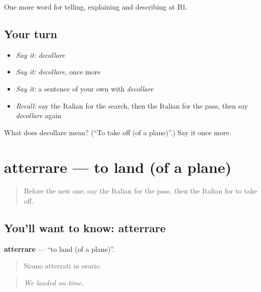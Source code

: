 \begin{grammarlens}[title={What you've built}]
One more word for telling, explaining and describing at B1.
\end{grammarlens}

\subsection*{Your turn}
\begin{itemize}
\raggedright
  \item \emph{Say it:} \emph{decollare}
  \item \emph{Say it:} \emph{decollare}, once more
  \item \emph{Say it:} a sentence of your own with \emph{decollare}
  \item \emph{Recall:} say the Italian for the search, then the Italian for the pass, then say \emph{decollare} again
\end{itemize}

\begin{tcolorbox}[breakable,colback=teal!4,colframe=teal!35!black,title={Before you move on}]
What does decollare mean? (\textquotedblleft{}To take off (of a plane)\textquotedblright{}.) Say it once more.
\end{tcolorbox}
\section[atterrare]{atterrare — to land (of a plane)}

\label{lesson:IT-C428-atterrare}



\begin{quote}
Before the new one: say the Italian for the pass, then the Italian for to take off.
\end{quote}

\subsection*{You'll want to know: atterrare}
\textbf{atterrare} — \textquotedblleft{}to land (of a plane)\textquotedblright{}.

\begin{quote}
Siamo atterrati in orario.
\end{quote}

\begin{quote}
\emph{We landed on time.}
\end{quote}

